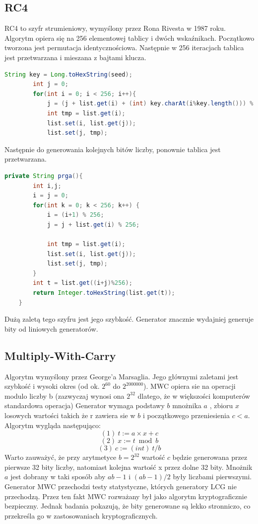 \documentclass[a4paper, 11pt]{article} %
\begin{document}
\subsection{RC4}
RC4 to szyfr strumieniowy, wymyślony przez Rona Rivesta w 1987 roku. Algorytm opiera się na 256 elementowej tablicy i dwóch wskaźnikach. Początkowo tworzona jest permutacja identycznościowa. Następnie w 256 iteracjach tablica jest przetwarzana i mieszana z bajtami klucza.
\begin{lstlisting}[style=mystyle, language=java, frame=single, caption = Inicjalizowanie RC4.]
        String key = Long.toHexString(seed);
        int j = 0;
        for(int i = 0; i < 256; i++){
            j = (j + list.get(i) + (int) key.charAt(i%key.length())) % 256;
            int tmp = list.get(i);
            list.set(i, list.get(j));
            list.set(j, tmp);
\end{lstlisting}
Następnie do generowania kolejnych bitów liczby, ponownie tablica jest przetwarzana.
\begin{lstlisting}[style=mystyle, language=java, frame=single, caption = Generowanie losowego bajtu liczby za pomocą RC4.]
    private String prga(){
        int i,j;
        i = j = 0;
        for(int k = 0; k < 256; k++) {
        	i = (i+1) % 256;
        	j = j + list.get(i) % 256;

        	int tmp = list.get(i);
        	list.set(i, list.get(j));
        	list.set(j, tmp);
        }
        int t = list.get((i+j)%256);
        return Integer.toHexString(list.get(t));
    }
\end{lstlisting}
Dużą zaletą tego szyfru jest jego szybkość. Generator znacznie wydajniej generuje bity od liniowych generatorów. 
\subsection{Multiply-With-Carry}
Algorytm wymyślony przez George'a Marsaglia. Jego głównymi zaletami jest szybkość i wysoki okres (od ok. $2^{60} $ do $2^{2000000}$).
MWC opiera sie na operacji modulo liczby b (zazwyczaj wynosi ona $2^{32}$ dlatego, że w większości komputerów standardowa operacja) 
Generator wymaga podstawy $b$ mnożnika $a$ , zbioru $x$ losowych wartości takich że r zawiera sie w $b$ i początkowego przeniesienia $c < a$. 
Algorytm wygląda następująco:
$$(1)\ t:=a \times x + c $$
$$(2)\ x:= t \bmod  b $$
$$(3)\ c:= (int)\ t/b$$
Warto zauważyć, że przy arytmetyce $b=2^{32}$ wartość $c$ będzie generowana przez pierwsze 32 bity liczby, natomiast kolejna wartość x przez dolne 32 bity. Mnożnik $a$ jest dobrany w taki sposób aby $ab-1$ i $(ab-1)/2$ były liczbami pierwszymi.
\newline Generator MWC przechodzi testy statystyczne, których generatory LCG nie przechodzą. Przez ten fakt MWC rozważany był jako algorytm kryptograficznie bezpieczny. Jednak badania pokazują, że bity generowane są lekko stronniczo, co przekreśla go w zastosowaniach kryptograficznych.	
\end{document}
